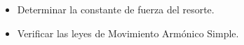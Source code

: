 \documentclass[../main.tex]{subfiles}
\begin{document}
\begin{itemize}
    \item Determinar la constante de fuerza del resorte.
    \item Verificar las leyes de Movimiento Armónico Simple.
\end{itemize}
\end{document}
